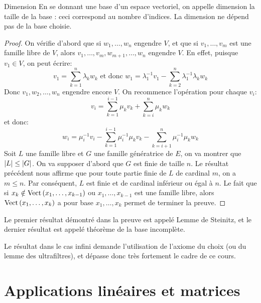 \documentclass{classe}
\begin{document}
\begin{définition}{Dimension}{}
	En se donnant une base d'un espace vectoriel, on appelle dimension la taille de la base : ceci correspond au nombre d'indices. La dimension ne dépend pas de la base choisie.
\end{définition}
\begin{proof}
	On vérifie d'abord que si $w_{1}, \ldots, w_{n}$ engendre $V$, et que si $v_{1}, \ldots, v_{m}$ est une famille libre de $V$, alors $v_{1}, \ldots, v_{m}, w_{m + 1}, \ldots, w_{n}$ engendre $V$.
	En effet, puisque $v_{1} \in V$, on peut écrire:
	\begin{equation*}
		v_{1} = \sum_{k = 1}^{n} \lambda_{k}w_{k} \text{ et donc } w_{1} = \lambda_{1}^{-1}v_{1} - \sum_{k = 2}^{n} \lambda_{1}^{-1}\lambda_{k}w_{k}
	\end{equation*}
	Donc $v_{1}, w_{2}, \ldots, w_{n}$ engendre encore $V$.
	On recommence l'opération pour chaque $v_{i}$:
	\begin{equation*}
		v_{i} = \sum_{k = 1}^{i - 1}\mu_{k}v_{k} + \sum_{k = i}^{n}\mu_{k}w_{k}
	\end{equation*}
	et donc:
	\begin{equation*}
		w_{i} = \mu_{i}^{-1}v_{i} - \sum_{k = 1}^{i - 1}\mu_{i}^{-1}\mu_{k}v_{k} - \sum_{k = i + 1}^{n}\mu_{i}^{-1}\mu_{k}w_{k}
	\end{equation*}
	Soit $L$ une famille libre et $G$ une famille génératrice de $E$, on va montrer que $\left|L\right| \leq \left|G\right|$.
	On va supposer d'abord que $G$ est finie de taille $n$. Le résultat précédent nous affirme que pour toute partie finie de $L$ de cardinal $m$, on a $m \leq n$.
	Par conséquent, $L$ est finie et de cardinal inférieur ou égal à $n$.
	Le fait que si $x_{k} \notin \operatorname{Vect}\left( x_{1}, \ldots, x_{k - 1} \right)$ ou $x_{1}, \ldots, x_{k - 1}$ est une famille libre, alors $\operatorname{Vect}\left( x_{1}, \ldots, x_{k} \right)$ a pour base $x_{1}, \ldots, x_{k}$ permet de terminer la preuve.
\end{proof}

Le premier résultat démontré dans la preuve est appelé Lemme de Steinitz, et le dernier résultat est appelé théorème de la base incomplète.

Le résultat dans le cas infini demande l'utilisation de l'axiome du choix (ou du lemme des ultrafiltres), et dépasse donc très fortement le cadre de ce cours.


\section{Applications linéaires et matrices}
\end{document}
